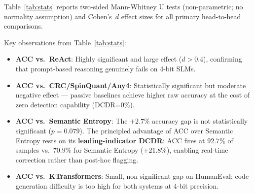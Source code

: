 \documentclass[runningheads]{article} %
\begin{document}
Table~\ref{tab:stats} reports two-sided Mann-Whitney U tests
(non-parametric; no normality assumption) and Cohen's~$d$ effect sizes
for all primary head-to-head comparisons.

\begin{table}[htbp]
\centering
\caption{Statistical significance of all ACC vs.\ baseline comparisons
(two-sided Mann-Whitney U; $n$ taken from minimum of pair sizes).
\textbf{***}~$p<0.001$, **~$p<0.01$, *~$p<0.05$, ns~$p\geq0.05$.}
\label{tab:stats}
\footnotesize
{}
\end{table}

Key observations from Table~\ref{tab:stats}:
\begin{itemize}
  \item \textbf{ACC vs.\ ReAct}: Highly significant and large effect ($d>0.4$),
    confirming that prompt-based reasoning genuinely fails on 4-bit SLMs.
  \item \textbf{ACC vs.\ CRC/SpinQuant/Any4}: Statistically significant
    but moderate negative effect --- passive baselines achieve higher raw accuracy
    at the cost of zero detection capability (DCDR=0\%).
  \item \textbf{ACC vs.\ Semantic Entropy}: The $+2.7\%$ accuracy gap
    is not statistically significant ($p=0.079$). The principled advantage of ACC
    over Semantic Entropy rests on its \textbf{leading-indicator DCDR}: ACC
    fires at $92.7\%$ of samples vs.\ $70.9\%$ for Semantic Entropy (+21.8\%),
    enabling real-time correction rather than post-hoc flagging.
  \item \textbf{ACC vs.\ KTransformers}: Small, non-significant gap on HumanEval;
    code generation difficulty is too high for both systems at 4-bit precision.
\end{itemize}
\end{document}
